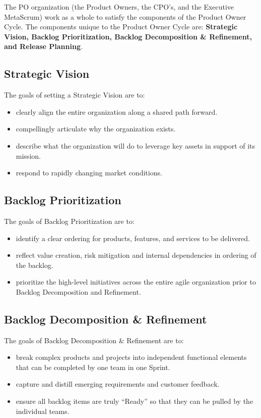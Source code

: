 \documentclass[12pt,a4paper,parskip=full]{scrartcl}
\begin{document}
The PO organization (the Product Owners, the CPO's, and the Executive MetaScrum) work as a whole to satisfy the components of the Product Owner Cycle. The components unique to the Product Owner Cycle are: \textbf{Strategic Vision, Backlog Prioritization, Backlog Decomposition \& Refinement, and Release Planning}.

\subsection{Strategic Vision}

The goals of setting a Strategic Vision are to:

\begin{itemize}
	\item clearly align the entire organization along a shared path forward.
	\item compellingly articulate why the organization exists.
	\item describe what the organization will do to leverage key assets in support of its mission.
	\item respond to rapidly changing market conditions.
\end{itemize}

\subsection{Backlog Prioritization}

The goals of Backlog Prioritization are to:

\begin{itemize}
	\item identify a clear ordering for products, features, and services to be delivered.
	\item reflect value creation, risk mitigation and internal dependencies in ordering of the backlog.
	\item prioritize the high-level initiatives across the entire agile organization prior to Backlog Decomposition and Refinement.
\end{itemize}

\subsection{Backlog Decomposition \& Refinement}

The goals of Backlog Decomposition \& Refinement are to:

\begin{itemize}
	\item break complex products and projects into independent functional elements that can be completed by one team in one Sprint.
	\item capture and distill emerging requirements and customer feedback.
	\item ensure all backlog items are truly ``Ready'' so that they can be pulled by the individual teams.
\end{itemize}
\end{document}
